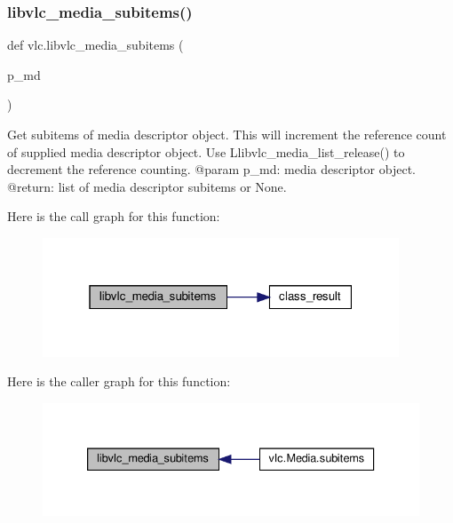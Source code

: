 \subsubsection{\texorpdfstring{libvlc\+\_\+media\+\_\+subitems()}{libvlc\_media\_subitems()}}
{\footnotesize\ttfamily def vlc.\+libvlc\+\_\+media\+\_\+subitems (\begin{DoxyParamCaption}\item[{}]{p\+\_\+md }\end{DoxyParamCaption})}

\begin{DoxyVerb}Get subitems of media descriptor object. This will increment
the reference count of supplied media descriptor object. Use
L{libvlc_media_list_release}() to decrement the reference counting.
@param p_md: media descriptor object.
@return: list of media descriptor subitems or None.
\end{DoxyVerb}
 Here is the call graph for this function\+:
\nopagebreak
\begin{figure}[H]
\begin{center}
\leavevmode
\includegraphics[width=301pt]{namespacevlc_a344d49b0fc84dc1cfa63ab5d03872d5f_cgraph}
\end{center}
\end{figure}
Here is the caller graph for this function\+:
\nopagebreak
\begin{figure}[H]
\begin{center}
\leavevmode
\includegraphics[width=333pt]{namespacevlc_a344d49b0fc84dc1cfa63ab5d03872d5f_icgraph}
\end{center}
\end{figure}
\mbox{\label{namespacevlc_a0698f7a1ab5f3f3c2d408c42530720dc}} 
